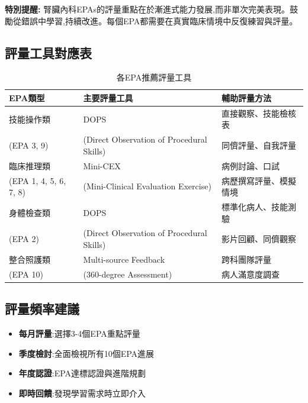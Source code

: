 \documentclass[12pt,a4paper]{article}
\begin{document}
\begin{importantbox}
\textbf{特別提醒:} 腎臟內科EPAs的評量重點在於漸進式能力發展,而非單次完美表現。鼓勵從錯誤中學習,持續改進。每個EPA都需要在真實臨床情境中反復練習與評量。
\end{importantbox}

\subsection{評量工具對應表}
\begin{table}[h]
    \centering
    \caption{各EPA推薦評量工具}
    \begin{tabular}{p{4.5cm} p{4cm} p{5.5cm}}
        \toprule
        \textbf{EPA類型} & \textbf{主要評量工具} & \textbf{輔助評量方法} \\
        \midrule
        技能操作類 & DOPS & 直接觀察、技能檢核表 \\
        (EPA 3, 9) & (Direct Observation of Procedural Skills) & 同儕評量、自我評量 \\
        \midrule
        臨床推理類 & Mini-CEX & 病例討論、口試 \\
        (EPA 1, 4, 5, 6, 7, 8) & (Mini-Clinical Evaluation Exercise) & 病歷撰寫評量、模擬情境 \\
        \midrule
        身體檢查類 & DOPS & 標準化病人、技能測驗 \\
        (EPA 2) & (Direct Observation of Procedural Skills) & 影片回顧、同儕觀察 \\
        \midrule
        整合照護類 & Multi-source Feedback & 跨科團隊評量 \\
        (EPA 10) & (360-degree Assessment) & 病人滿意度調查 \\
        \bottomrule
    \end{tabular}
\end{table}

\subsection{評量頻率建議}
\begin{itemize}[nosep]
    \item \textbf{每月評量}:選擇3-4個EPA重點評量
    \item \textbf{季度檢討}:全面檢視所有10個EPA進展
    \item \textbf{年度認證}:EPA達標認證與進階規劃
    \item \textbf{即時回饋}:發現學習需求時立即介入
\end{itemize}
\end{document}
